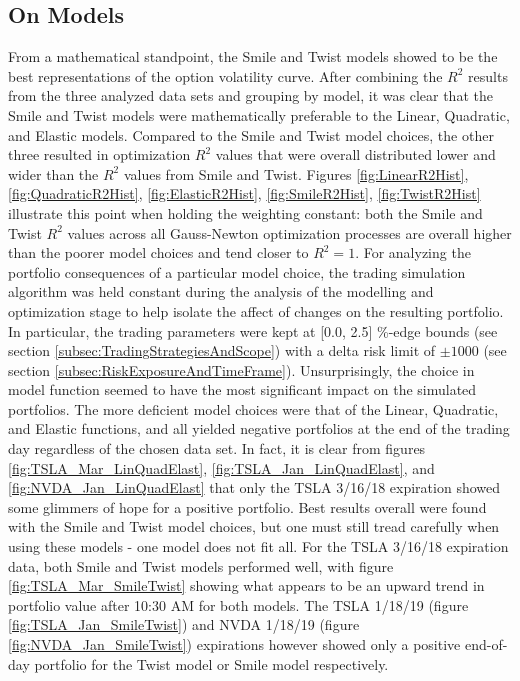 \documentclass[12pt, a4paper, notitlepage]{article}
\numberwithin{equation}{subsection}
\numberwithin{figure}{subsection}
\numberwithin{table}{subsection}
\newcommand{\newpar}{\newline \newline}
\begin{document}
\subsection{On Models}
From a mathematical standpoint, the Smile and Twist models showed to be the best representations of the option volatility curve.  After combining the $R^{2}$ results from the three analyzed data sets and grouping by model, it was clear that the Smile and Twist models were mathematically preferable to the Linear, Quadratic, and Elastic models. Compared to the Smile and Twist model choices, the other three resulted in optimization $R^{2}$ values that were overall distributed lower and wider than the $R^{2}$ values from Smile and Twist.  Figures \ref{fig:LinearR2Hist}, \ref{fig:QuadraticR2Hist}, \ref{fig:ElasticR2Hist},
\ref{fig:SmileR2Hist}, \ref{fig:TwistR2Hist} illustrate this point when holding the weighting constant: both the Smile and Twist $R^{2}$ values across all Gauss-Newton optimization processes are overall higher than the poorer model choices and tend closer to $R^{2} = 1$.
\newpar
For analyzing the portfolio consequences of a particular model choice, the trading simulation algorithm was held constant during the analysis of the modelling and optimization stage to help isolate the affect of changes on the resulting portfolio.  In particular, the trading parameters were kept at [0.0, 2.5] \%-edge bounds (see section \ref{subsec:TradingStrategiesAndScope}) with a delta risk limit of $\pm 1000$ (see section \ref{subsec:RiskExposureAndTimeFrame}).
\newpar
Unsurprisingly, the choice in model function seemed to have the most significant impact on the simulated portfolios.  The more deficient model choices were that of the Linear, Quadratic, and Elastic functions, and all yielded negative portfolios at the end of the trading day regardless of the chosen data set.  In fact, it is clear from figures \ref{fig:TSLA_Mar_LinQuadElast}, \ref{fig:TSLA_Jan_LinQuadElast}, and \ref{fig:NVDA_Jan_LinQuadElast} that only the TSLA 3/16/18 expiration showed some glimmers of hope for a positive portfolio.
\newpar
Best results overall were found with the Smile and Twist model choices, but one must still tread carefully when using these models - one model does not fit all.  For the TSLA 3/16/18 expiration data, both Smile and Twist models performed well, with figure \ref{fig:TSLA_Mar_SmileTwist} showing what appears to be an upward trend in portfolio value after 10:30 AM for both models.  The TSLA 1/18/19 (figure \ref{fig:TSLA_Jan_SmileTwist}) and NVDA 1/18/19 (figure \ref{fig:NVDA_Jan_SmileTwist}) expirations however showed only a positive end-of-day portfolio for the Twist model or Smile model respectively.
\end{document}
